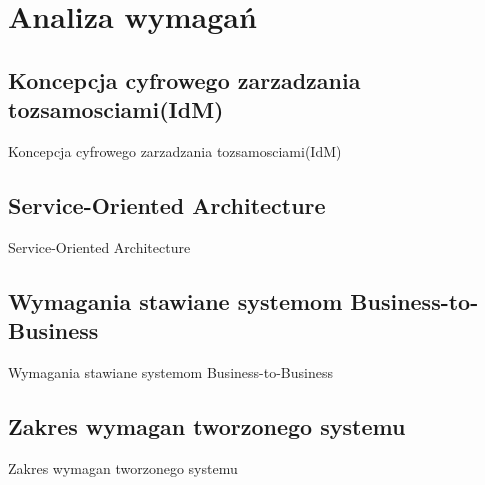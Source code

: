 \chapter{Analiza wymagań}
\label{cha:analizaWymagan}


\section{Koncepcja cyfrowego zarzadzania tozsamosciami(IdM)}
\label{sec:konceptcjaIdM}

Koncepcja cyfrowego zarzadzania tozsamosciami(IdM)


\section{Service-Oriented Architecture}
\label{sec:soa}

Service-Oriented Architecture


\section{Wymagania stawiane systemom Business-to-Business}
\label{sec:wymaganiaB2B}

Wymagania stawiane systemom Business-to-Business


\section{Zakres wymagan tworzonego systemu}
\label{sec:zakresWymagan}

Zakres wymagan tworzonego systemu

